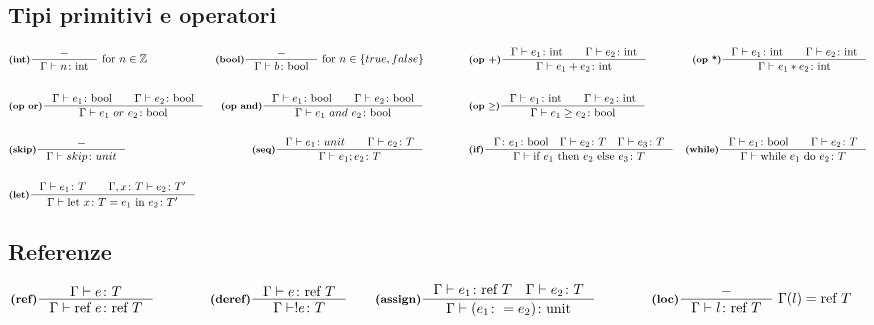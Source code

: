 \documentclass[a4paper, 10pt]{article}
\newcommand{\numberset}{\mathbb}
\newcommand{\Z}{\numberset{Z}}
\newcommand{\integer}{\textup{int}}
\newcommand{\bool}{\textup{bool}}
\newcommand{\infer}[4]{\inference[\textbf{#1}]{#2}{#3}#4 }
\begin{document}
\subsection*{Tipi primitivi e operatori}
	\begin{align*}
		&\infer{(int)}{-}{\Gamma \vdash n\colon \integer}{\ \textup{for}\ n \in \Z} 
		&\infer{(bool)}{-}{\Gamma \vdash b\colon \bool}{\ \textup{for}\ n \in \{true, false\}} \qquad\qquad
		&\infer{(op +)}{\Gamma \vdash e_1\colon \integer\qquad \Gamma \vdash e_2\colon \integer}{\Gamma\vdash e_1 + e_2 \colon \integer}{}
		&\infer{(op *)}{\Gamma \vdash e_1\colon \integer\qquad \Gamma \vdash e_2\colon \integer}{\Gamma\vdash e_1 * e_2 \colon \integer}{} \\ \\
		&\infer{(op or)}{\Gamma\vdash e_1\colon \bool\qquad \Gamma\vdash e_2\colon\bool}{\Gamma\vdash e_1\ or\ e_2 \colon\bool}{}
		&\infer{(op and)}{\Gamma\vdash e_1\colon \bool\qquad \Gamma\vdash e_2\colon\bool}{\Gamma\vdash e_1\ and\ e_2 \colon\bool}{} \qquad\qquad
		&\infer{(op $ \geq $)}{\Gamma \vdash e_1\colon \integer\qquad \Gamma \vdash e_2\colon \integer}{\Gamma\vdash e_1 \geq e_2 \colon \bool}{}
		\\ \\
		&\infer{(skip)}{-}{\Gamma\vdash skip\colon unit}{}
		&\infer{(seq)}{\Gamma \vdash e_1\colon unit \qquad \Gamma\vdash e_2\colon T}{\Gamma \vdash e_1;e_2\colon T}{} \qquad\qquad
		&\infer{(if)}{\Gamma\colon e_1\colon\bool\quad\Gamma\vdash e_2\colon T\quad \Gamma\vdash e_3 \colon T}{\Gamma\vdash \textup{if}\ e_1\ \textup{then}\ e_2\ \textup{else}\ e_3\colon T }{} 
		&\infer{(while)}{\Gamma\vdash e_1 \colon \bool\qquad \Gamma\vdash e_2 \colon T}{\Gamma \vdash\textup{while}\ e_1\ \textup{do}\ e_2\colon T}{}\\ \\
		&\infer{(let)}{\Gamma \vdash e_1\colon T\qquad \Gamma,x\colon T \vdash e_2\colon T'}{
			\Gamma\vdash \textup{let}\ x\colon T = e_1\ \textup{in}\ e_2\colon T'}{}
	\end{align*}
\subsection*{Referenze}
	\begin{align*}
		&\infer{(ref)}{\Gamma\vdash e \colon T}{\Gamma\vdash \text{ref } e\colon \text{ref } T}{}  \qquad  \qquad
		\infer{(deref)}{\Gamma\vdash e \colon\text{ref } T}{\Gamma\vdash !e \colon T}{} \qquad
		\infer{(assign)}{\Gamma\vdash e_1\colon \text{ref } T\quad \Gamma\vdash e_2\colon T }{\Gamma\vdash (e_1 \colon = e_2)\colon \text{unit}}{}\qquad  \qquad
		\infer{(loc)}{-}{\Gamma\vdash l\colon \text{ref } T}{\ \Gamma (l) = \text{ref } T}
	\end{align*}
\end{document}

